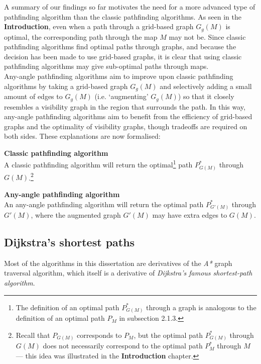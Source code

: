 \documentclass[12pt,notitlepage]{report}
\begin{document}
A summary of our findings so far motivates the need for a more advanced type of pathfinding algorithm than the classic pathfinding algorithms. As seen in the {\bfseries Introduction}, even when a path through a grid-based graph $G_{g}(M)$ is optimal, the corresponding path through the map $M$ may not be. Since classic pathfinding algorithms find optimal paths through graphs, and because the decision has been made to use grid-based graphs, it is clear that using classic pathfinding algorithms may give sub-optimal paths through maps.\\

\noindent
Any-angle pathfinding algorithms aim to improve upon classic pathfinding algorithms by taking a grid-based graph $G_{g}(M)$ and selectively adding a small amount of edges to $G_{g}(M)$ (i.e. `augmenting' $G_{g}(M)$) so that it closely resembles a visibility graph in the region that surrounds the path. In this way, any-angle pathfinding algorithms aim to benefit from the efficiency of grid-based graphs and the optimality of visibility graphs, though tradeoffs are required on both sides. These explanations are now formalised:

\begin{description}
\item{\bfseries Classic pathfinding algorithm}\\
A classic pathfinding algorithm will return the optimal\footnote{The definition of an optimal path $P^{*}_{G(M)}$ through a graph is analogous to the definition of an optimal path $P_{M}$ in subsection 2.1.3.}  path $P^{*}_{G(M)}$ through $G(M)$.\footnote{Recall that $P_{G(M)}$ corresponds to $P_{M}$, but the optimal path $P^{*}_{G(M)}$ through $G(M)$ does not necessarily correspond to the optimal path $P^{*}_{M}$ through $M$ --- this idea was illustrated in the {\bfseries Introduction} chapter.}
\item{\bfseries Any-angle pathfinding algorithm}\\
An any-angle pathfinding algorithm will return the optimal path $P^{*}_{G'(M)}$ through $G'(M)$, where the augmented graph $G'(M)$ may have extra edges to $G(M)$.
\end{description}

\subsection {Dijkstra's shortest paths}

Most of the algorithms in this dissertation are derivatives of the {\em A*} graph traversal algorithm, which itself is a derivative of {\em Dijkstra's famous shortest-path algorithm}.\\
\end{document}
